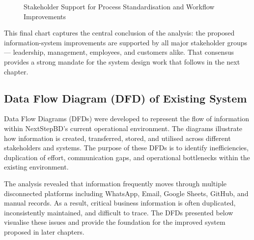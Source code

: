 \documentclass[12pt,a4paper]{report}
\begin{document}
\begin{figure}[H]
\centering
{}
\caption{Stakeholder Support for Process Standardisation and Workflow Improvements}
\label{fig:stake_support}
\end{figure}

This final chart captures the central conclusion of the analysis: the proposed information-system improvements are supported by all major stakeholder groups --- leadership, management, employees, and customers alike. That consensus provides a strong mandate for the system design work that follows in the next chapter.


\subsection{Data Flow Diagram (DFD) of Existing System}

Data Flow Diagrams (DFDs) were developed to represent the flow of information within NextStepBD's current operational environment. The diagrams illustrate how information is created, transferred, stored, and utilised across different stakeholders and systems. The purpose of these DFDs is to identify inefficiencies, duplication of effort, communication gaps, and operational bottlenecks within the existing environment.

The analysis revealed that information frequently moves through multiple disconnected platforms including WhatsApp, Email, Google Sheets, GitHub, and manual records. As a result, critical business information is often duplicated, inconsistently maintained, and difficult to trace. The DFDs presented below visualise these issues and provide the foundation for the improved system proposed in later chapters.
\end{document}
